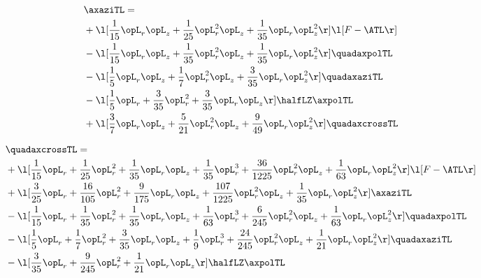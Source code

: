 \begin{alignat}{2} 
\label{eq:linaxaziTL_1} 
& \axaziTL = \\ 
& + \l[ \frac{1}{15} \opL_r \opL_z + \frac{1}{25} \opL_r^{2} \opL_z + \frac{1}{35} \opL_r \opL_z^{2}  \r] \l[ F - \ATL \r] \nonumber \\ 
& - \l[ \frac{1}{15} \opL_r \opL_z + \frac{1}{35} \opL_r^{2} \opL_z + \frac{1}{35} \opL_r \opL_z^{2}  \r] \quadaxpolTL \nonumber \\ 
& - \l[ \frac{1}{5} \opL_r \opL_z + \frac{1}{7} \opL_r^{2} \opL_z + \frac{3}{35} \opL_r \opL_z^{2}  \r] \quadaxaziTL \nonumber \\ 
& - \l[ \frac{1}{5} \opL_r + \frac{3}{35} \opL_r^{2} + \frac{3}{35} \opL_r \opL_z  \r] \halfLZ \axpolTL \nonumber \\ 
& + \l[ \frac{3}{7} \opL_r \opL_z + \frac{5}{21} \opL_r^{2} \opL_z + \frac{9}{49} \opL_r \opL_z^{2}  \r] \quadaxcrossTL \nonumber \\ 
\end{alignat} 


\begin{alignat}{2} 
\label{eq:quadaxcrossTL_1} 
& \quadaxcrossTL = \\ 
& + \l[ \frac{1}{15} \opL_r + \frac{1}{25} \opL_r^{2} + \frac{1}{35} \opL_r \opL_z + \frac{1}{35} \opL_r^{3} + \frac{36}{1225} \opL_r^{2} \opL_z + \frac{1}{63} \opL_r \opL_z^{2}  \r] \l[ F - \ATL \r] \nonumber \\ 
& + \l[ \frac{3}{25} \opL_r + \frac{16}{105} \opL_r^{2} + \frac{9}{175} \opL_r \opL_z + \frac{107}{1225} \opL_r^{2} \opL_z + \frac{1}{35} \opL_r \opL_z^{2}  \r] \axaziTL \nonumber \\ 
& - \l[ \frac{1}{15} \opL_r + \frac{1}{35} \opL_r^{2} + \frac{1}{35} \opL_r \opL_z + \frac{1}{63} \opL_r^{3} + \frac{6}{245} \opL_r^{2} \opL_z + \frac{1}{63} \opL_r \opL_z^{2}  \r] \quadaxpolTL \nonumber \\ 
& - \l[ \frac{1}{5} \opL_r + \frac{1}{7} \opL_r^{2} + \frac{3}{35} \opL_r \opL_z + \frac{1}{9} \opL_r^{3} + \frac{24}{245} \opL_r^{2} \opL_z + \frac{1}{21} \opL_r \opL_z^{2}  \r] \quadaxaziTL \nonumber \\ 
& - \l[ \frac{3}{35} \opL_r + \frac{9}{245} \opL_r^{2} + \frac{1}{21} \opL_r \opL_z  \r] \halfLZ \axpolTL \nonumber \\ 
\end{alignat} 


